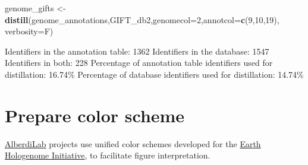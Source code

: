 \documentclass[
]{book}
\newenvironment{Shaded}{\begin{snugshade}}{\end{snugshade}}
\newcommand{\AttributeTok}[1]{\textcolor[rgb]{0.13,0.29,0.53}{#1}}
\newcommand{\DecValTok}[1]{\textcolor[rgb]{0.00,0.00,0.81}{#1}}
\newcommand{\FunctionTok}[1]{\textcolor[rgb]{0.13,0.29,0.53}{\textbf{#1}}}
\newcommand{\NormalTok}[1]{#1}
\newcommand{\OtherTok}[1]{\textcolor[rgb]{0.56,0.35,0.01}{#1}}
\begin{document}
\begin{Shaded}
\begin{Highlighting}[]
\NormalTok{genome\_gifts }\OtherTok{\textless{}{-}} \FunctionTok{distill}\NormalTok{(genome\_annotations,GIFT\_db2,}\AttributeTok{genomecol=}\DecValTok{2}\NormalTok{,}\AttributeTok{annotcol=}\FunctionTok{c}\NormalTok{(}\DecValTok{9}\NormalTok{,}\DecValTok{10}\NormalTok{,}\DecValTok{19}\NormalTok{), }\AttributeTok{verbosity=}\NormalTok{F)}
\end{Highlighting}
\end{Shaded}

\begin{Shaded}
\begin{Highlighting}[]

\NormalTok{Identifiers in the annotation table: 1362 }
\NormalTok{Identifiers in the database: 1547 }
\NormalTok{Identifiers in both: 228 }
\NormalTok{Percentage of annotation table identifiers used for distillation: 16.74\%}
\NormalTok{Percentage of database identifiers used for distillation: 14.74\%}
\end{Highlighting}
\end{Shaded}

\section{Prepare color scheme}\label{prepare-color-scheme}

\href{www.alberdilab.dk}{AlberdiLab} projects use unified color schemes
developed for the \href{www.earthhologenome.org}{Earth Hologenome
Initiative}, to facilitate figure interpretation.
\end{document}
